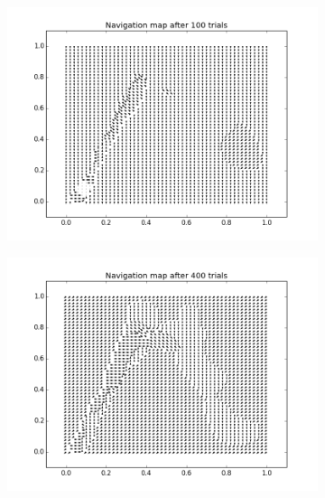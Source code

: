 \begin{figure}[H!]
\centering
\begin{subfigure}[h!]{0.6\textwidth}
    \includegraphics[width=\textwidth]{figures/nmap_100.png}
\end{subfigure}
\begin{subfigure}[h!]{0.6\textwidth}
    \includegraphics[width=\textwidth]{figures/nmap_400.png}
\end{subfigure}
\begin{subfigure}[h!]{0.6\textwidth}

\end{subfigure}
\end{figure}
